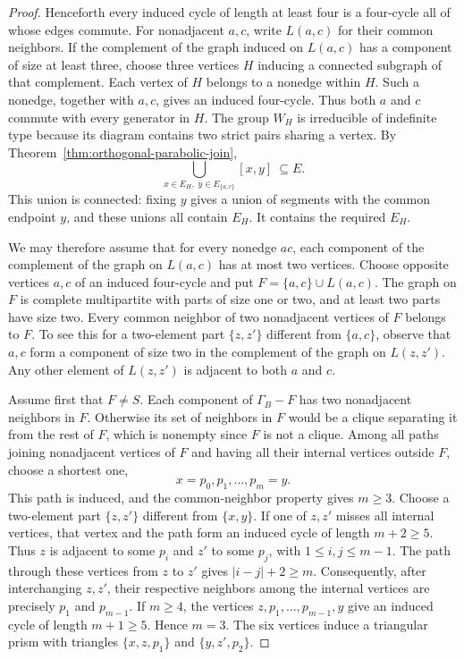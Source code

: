 \documentclass[11pt,reqno]{amsart}
\theoremstyle{plain}
\theoremstyle{definition}
\theoremstyle{remark}
\numberwithin{equation}{section}
\begin{document}
\begin{proof}
Henceforth every induced cycle of length at least four is a
four-cycle all of whose edges commute. For nonadjacent $a,c$,
write $L(a,c)$ for their common neighbors. If the complement of
the graph induced on $L(a,c)$ has a component of size at least
three, choose three vertices $H$ inducing a connected subgraph
of that complement. Each vertex of $H$ belongs to a nonedge
within $H$. Such a nonedge, together with $a,c$, gives an
induced four-cycle. Thus both $a$ and $c$ commute with every
generator in $H$. The group $W_H$ is irreducible of indefinite
type because its diagram contains two strict pairs sharing a
vertex. By Theorem~\ref{thm:orthogonal-parabolic-join},
\[
  \bigcup_{x\in E_H,\;y\in E_{\{a,c\}}}[x,y]\ \subseteq E .
\]
This union is connected: fixing $y$ gives a union of segments
with the common endpoint $y$, and these unions all contain $E_H$.
It contains the required $E_H$.

We may therefore assume that for every nonedge $ac$, each
component of the complement of the graph on $L(a,c)$ has at
most two vertices. Choose opposite vertices $a,c$ of an induced
four-cycle and put $F=\{a,c\}\cup L(a,c)$. The graph on $F$
is complete multipartite with parts of size one or two, and at
least two parts have size two. Every common neighbor of two
nonadjacent vertices of $F$ belongs to $F$. To see this for a
two-element part $\{z,z'\}$ different from $\{a,c\}$, observe
that $a,c$ form a component of size two in the complement of the
graph on $L(z,z')$. Any other element of $L(z,z')$ is adjacent
to both $a$ and $c$.

Assume first that $F\ne S$. Each component of $\Gamma_B-F$ has
two nonadjacent neighbors in $F$. Otherwise its set of neighbors
in $F$ would be a clique separating it from the rest of $F$,
which is nonempty since $F$ is not a clique. Among all paths
joining nonadjacent vertices of $F$ and having all their internal
vertices outside $F$, choose a shortest one,
\[
                 x=p_0,p_1,\ldots,p_m=y .
\]
This path is induced, and the common-neighbor property gives
$m\geq3$. Choose a two-element part $\{z,z'\}$ different from
$\{x,y\}$. If one of $z,z'$ misses all internal vertices,
that vertex and the path form an induced cycle of length
$m+2\geq5$. Thus $z$ is adjacent to some $p_i$ and $z'$ to some
$p_j$, with $1\leq i,j\leq m-1$. The path through these
vertices from $z$ to $z'$ gives $|i-j|+2\geq m$. Consequently,
after interchanging $z,z'$, their respective neighbors among
the internal vertices are precisely $p_1$ and $p_{m-1}$. If
$m\geq4$, the vertices $z,p_1,\ldots,p_{m-1},y$ give an induced
cycle of length $m+1\geq5$. Hence $m=3$. The six vertices induce
a triangular prism with triangles $\{x,z,p_1\}$ and
$\{y,z',p_2\}$.


\end{proof}
\end{document}
